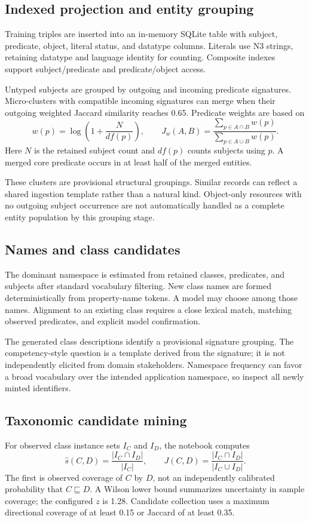\documentclass[11pt,a4paper]{article}
\begin{document}
\subsection{Indexed projection and entity grouping}
Training triples are inserted into an in-memory SQLite table with subject,
predicate, object, literal status, and datatype columns. Literals use N3 strings,
retaining datatype and language identity for counting. Composite indexes support
subject/predicate and predicate/object access.

Untyped subjects are grouped by outgoing and incoming predicate signatures.
Micro-clusters with compatible incoming signatures can merge when their outgoing
weighted Jaccard similarity reaches 0.65. Predicate weights are based on
\[
  w(p)=\log\!\left(1+\frac{N}{df(p)}\right),\qquad
  J_w(A,B)=\frac{\sum_{p\in A\cap B}w(p)}{\sum_{p\in A\cup B}w(p)}.
\]
Here $N$ is the retained subject count and $df(p)$ counts subjects using $p$.
A merged core predicate occurs in at least half of the merged entities.

These clusters are provisional structural groupings. Similar records can reflect
a shared ingestion template rather than a natural kind. Object-only resources
with no outgoing subject occurrence are not automatically handled as a complete
entity population by this grouping stage.

\subsection{Names and class candidates}
The dominant namespace is estimated from retained classes, predicates, and
subjects after standard vocabulary filtering. New class names are formed
deterministically from property-name tokens. A model may choose among those
names. Alignment to an existing class requires a close lexical match, matching
observed predicates, and explicit model confirmation.

The generated class descriptions identify a provisional signature grouping.
The competency-style question is a template derived from the signature; it is
not independently elicited from domain stakeholders. Namespace frequency can
favor a broad vocabulary over the intended application namespace, so inspect
all newly minted identifiers.

\subsection{Taxonomic candidate mining}
For observed class instance sets $I_C$ and $I_D$, the notebook computes
\[
  \widehat{s}(C,D)=\frac{|I_C\cap I_D|}{|I_C|},\qquad
  J(C,D)=\frac{|I_C\cap I_D|}{|I_C\cup I_D|}.
\]
The first is observed coverage of $C$ by $D$, not an independently calibrated
probability that $C\sqsubseteq D$. A Wilson lower bound summarizes uncertainty in
sample coverage; the configured $z$ is 1.28. Candidate collection uses a maximum
directional coverage of at least 0.15 or Jaccard of at least 0.35.
\end{document}
